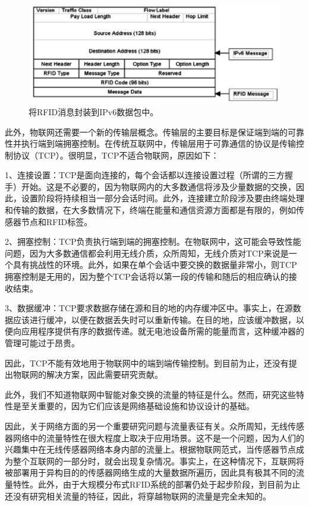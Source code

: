 \documentclass[12pt,a4paper]{article}%
\begin{document}
\begin{figure}[H]%
	\centering
	\begin{minipage}{0.83\textwidth}%
		\centering
		\includegraphics[width=1.0%
		\textwidth]{fig7.jpg}%
		\caption{\fontsize{10pt}{15pt}\selectfont 将RFID消息封装到IPv6数据包中。}%
	\end{minipage}
\end{figure}
此外，物联网还需要一个新的传输层概念。传输层的主要目标是保证端到端的可靠性并执行端到端拥塞控制。在传统互联网中，传输层用于可靠通信的协议是传输控制协议（TCP）。很明显，TCP不适合物联网，原因如下：

1、连接设置：TCP是面向连接的，每个会话都以连接设置过程（所谓的三方握手）开始。这是不必要的，因为物联网内的大多数通信将涉及少量数据的交换，因此，设置阶段将持续相当一部分会话时间。此外，连接建立阶段涉及要由终端处理和传输的数据，在大多数情况下，终端在能量和通信资源方面都是有限的，例如传感器节点和RFID标签。

2、拥塞控制：TCP负责执行端到端的拥塞控制。在物联网中，这可能会导致性能问题，因为大多数通信都会利用无线介质，众所周知，无线介质对TCP来说是一个具有挑战性的环境。此外，如果在单个会话中要交换的数据量非常小，则TCP拥塞控制是无用的，因为整个TCP会话将以第一段的传输和随后的相应确认的接收结束。

3、数据缓冲：TCP要求数据存储在源和目的地的内存缓冲区中。事实上，在源数据应该进行缓冲，以便在数据丢失时可以重新传输。在目的地，应该缓冲数据，以便向应用程序提供有序的数据传递。就无电池设备所需的能量而言，这种缓冲器的管理可能过于昂贵。

因此，TCP不能有效地用于物联网中的端到端传输控制。到目前为止，还没有提出物联网的解决方案，因此需要研究贡献。

此外，我们不知道物联网中智能对象交换的流量的特征是什么。然而，研究这些特性是至关重要的，因为它们应该是网络基础设施和协议设计的基础。

因此，关于网络方面的另一个重要研究问题与流量表征有关。众所周知，无线传感器网络中的流量特性在很大程度上取决于应用场景。这不是一个问题，因为人们的兴趣集中在无线传感器网络本身内部的流量上。根据物联网范式，当传感器节点成为整个互联网的一部分时，就会出现复杂情况。事实上，在这种情况下，互联网将被部署用于异构目的的传感器网络生成的大量数据所遍历，因此具有极其不同的流量特性。此外，由于大规模分布式RFID系统的部署仍处于起步阶段，到目前为止还没有研究相关流量的特征，因此，将穿越物联网的流量是完全未知的。
\end{document}
